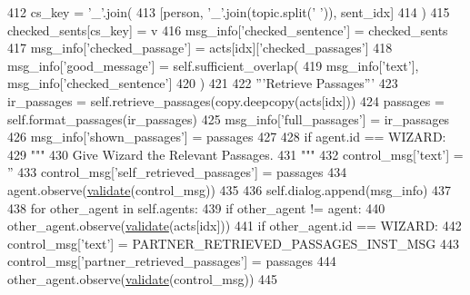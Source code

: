 \begin{DoxyCode}
412                         cs\_key = \textcolor{stringliteral}{'\_'}.join(
413                             [person, \textcolor{stringliteral}{'\_'}.join(topic.split(\textcolor{stringliteral}{' '})), sent\_idx]
414                         )
415                         checked\_sents[cs\_key] = v
416                 msg\_info[\textcolor{stringliteral}{'checked\_sentence'}] = checked\_sents
417                 msg\_info[\textcolor{stringliteral}{'checked\_passage'}] = acts[idx][\textcolor{stringliteral}{'checked\_passages'}]
418                 msg\_info[\textcolor{stringliteral}{'good\_message'}] = self.sufficient\_overlap(
419                     msg\_info[\textcolor{stringliteral}{'text'}], msg\_info[\textcolor{stringliteral}{'checked\_sentence'}]
420                 )
421 
422             \textcolor{stringliteral}{'''Retrieve Passages'''}
423             ir\_passages = self.retrieve\_passages(copy.deepcopy(acts[idx]))
424             passages = self.format\_passages(ir\_passages)
425             msg\_info[\textcolor{stringliteral}{'full\_passages'}] = ir\_passages
426             msg\_info[\textcolor{stringliteral}{'shown\_passages'}] = passages
427 
428             \textcolor{keywordflow}{if} agent.id == WIZARD:
429                 \textcolor{stringliteral}{"""}
430 \textcolor{stringliteral}{                Give Wizard the Relevant Passages.}
431 \textcolor{stringliteral}{                """}
432                 control\_msg[\textcolor{stringliteral}{'text'}] = \textcolor{stringliteral}{''}
433                 control\_msg[\textcolor{stringliteral}{'self\_retrieved\_passages'}] = passages
434                 agent.observe(\hyperlink{namespaceparlai_1_1core_1_1worlds_afc3fad603b7bce41dbdc9cdc04a9c794}{validate}(control\_msg))
435 
436             self.dialog.append(msg\_info)
437 
438             \textcolor{keywordflow}{for} other\_agent \textcolor{keywordflow}{in} self.agents:
439                 \textcolor{keywordflow}{if} other\_agent != agent:
440                     other\_agent.observe(\hyperlink{namespaceparlai_1_1core_1_1worlds_afc3fad603b7bce41dbdc9cdc04a9c794}{validate}(acts[idx]))
441                     \textcolor{keywordflow}{if} other\_agent.id == WIZARD:
442                         control\_msg[\textcolor{stringliteral}{'text'}] = PARTNER\_RETRIEVED\_PASSAGES\_INST\_MSG
443                         control\_msg[\textcolor{stringliteral}{'partner\_retrieved\_passages'}] = passages
444                         other\_agent.observe(\hyperlink{namespaceparlai_1_1core_1_1worlds_afc3fad603b7bce41dbdc9cdc04a9c794}{validate}(control\_msg))
445 
\end{DoxyCode}
